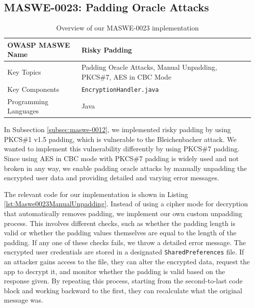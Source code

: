 \subsection{MASWE-0023: Padding Oracle Attacks}

\begin{table}[H]
    \centering
    \renewcommand{\arraystretch}{1.3}
        \begin{tabular}{p{5cm} p{8cm}} 
        \toprule
        OWASP MASWE Name & Risky Padding \\ 
        \midrule
        Key Topics & Padding Oracle Attacks, Manual Unpadding, PKCS\#7, AES in CBC Mode \\
        Key Components & \texttt{EncryptionHandler.java} \\
        Programming Languages & Java \\ 
        \bottomrule
        \end{tabular}
    \caption{Overview of our MASWE-0023 implementation}
    \label{tab:maswe-0023}
\end{table}

In Subsection \ref{subsec:maswe-0012}, we implemented risky padding by using PKCS\#1 v1.5 padding, which is vulnerable to the Bleichenbacher attack. We wanted to implement this vulnerability differently by using PKCS\#7 padding. Since using AES in CBC mode with PKCS\#7 padding is widely used and not broken in any way, we enable padding oracle attacks by manually unpadding the encrypted user data and providing detailed and varying error messages.

The relevant code for our implementation is shown in Listing \ref{lst:Maswe0023ManualUnpadding}. Instead of using a cipher mode for decryption that automatically removes padding, we implement our own custom unpadding process. This involves different checks, such as whether the padding length is valid or whether the padding values themselves are equal to the length of the padding. If any one of these checks fails, we throw a detailed error message. The encrypted user credentials are stored in a designated \texttt{SharedPreferences} file. If an attacker gains access to the file, they can alter the encrypted data, request the app to decrypt it, and monitor whether the padding is valid based on the response given. By repeating this process, starting from the second-to-last code block and working backward to the first, they can recalculate what the original message was. 

